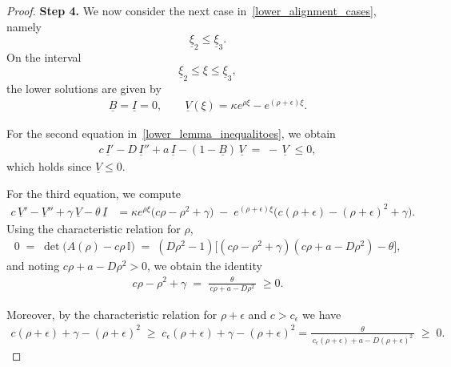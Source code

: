 \documentclass[11pt]{article}
\theoremstyle{definition}
\begin{document}
\begin{proof}
\textbf{Step 4.} We now consider the next case in~\eqref{lower_alignment_cases}, namely  
\[
\underline{\xi}_{2} \le \underline{\xi}_{3}.
\]
On the interval
\[
\underline{\xi}_{2} \le \xi \le \underline{\xi}_{3},
\]
the lower solutions are given by
\begin{align}
    \underline{B} = \underline{I} = 0,
    \qquad
    \underline{V}(\xi) = \kappa e^{\rho \xi} - e^{(\rho+\epsilon)\xi}.
\end{align}

For the second equation in~\eqref{lower_lemma_inequalitoes}, we obtain
\begin{align}
    c\,\underline{I}' - D\,\underline{I}'' + a\,\underline{I}
    - (1-\underline{B})\,\underline{V}
    \;=\; -\,\underline{V}
    \;\le 0,
\end{align}
which holds since $\underline{V} \le 0$.

For the third equation, we compute
\begin{align}\label{V_equation_A}
    c\,\underline{V}' - \underline{V}'' + \gamma\,\underline{V} - \theta\,\underline{I}
    &= 
    \kappa e^{\rho \xi} \bigl(c\rho - \rho^{2} + \gamma \bigr)
    \;-\;
    e^{(\rho+\epsilon)\xi} \bigl( c(\rho+\epsilon) - (\rho+\epsilon)^{2} + \gamma \bigr).
\end{align}
Using the characteristic relation for $\rho$,
\begin{align}\label{char_rho}
0 \;=\; \det\!\bigl(A(\rho) - c\rho\,\mathbb{I}\bigr)
    \;=\; (D\rho^{2}-1)\Big[(c\rho - \rho^{2} + \gamma)(c\rho+a-D\rho^2) - \theta\Big],
\end{align}
and noting $c\rho+a-D\rho^{2}>0$, we obtain the identity
\begin{align}\label{crho_identity}
c\rho - \rho^{2} + \gamma \;=\; \frac{\theta}{\,c\rho + a - D\rho^{2}\,}\;\ge0.
\end{align}

Moreover, by the characteristic relation for $\rho+\epsilon$ and  $c>c_\epsilon$ we have
\begin{align}
    c(\rho+\epsilon) + \gamma - (\rho+\epsilon)^{2}
    \;\ge\;
    c_{\epsilon}(\rho+\epsilon) + \gamma - (\rho+\epsilon)^{2}
    = \frac{\theta}{\,c_{\epsilon}(\rho+\epsilon) + a - D(\rho+\epsilon)^{2}\,}
    \;\ge\; 0.
\end{align}
{

}
\end{proof}
\end{document}
